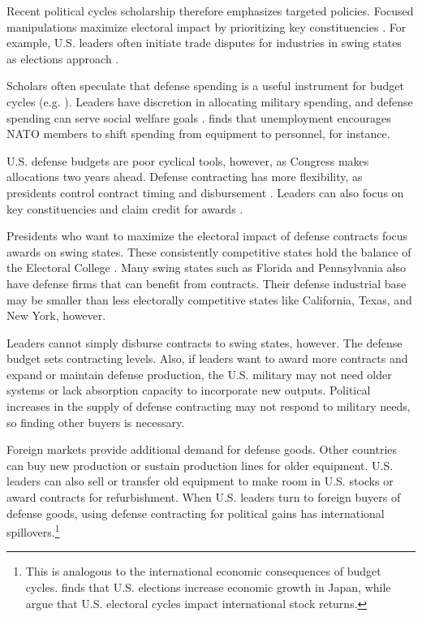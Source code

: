 \documentclass[12pt]{article}
\begin{document}
Recent political cycles scholarship therefore emphasizes targeted policies.
Focused manipulations maximize electoral impact by prioritizing key constituencies \citep[pg. 248]{Dubois2016}.
For example, U.S. leaders often initiate trade disputes for industries in swing states as elections approach \citep{Conconietal2017}.%


Scholars often speculate that defense spending is a useful instrument for budget cycles (e.g. \cite{Tufte1978, Mintz1988}).
Leaders have discretion in allocating military spending, and defense spending can serve social welfare goals \citep{WhittenWilliams2011}.
\citet{Becker2021} finds that unemployment encourages NATO members to shift spending from equipment to personnel, for instance.


U.S. defense budgets are poor cyclical tools, however, as Congress makes allocations two years ahead.
Defense contracting has more flexibility, as presidents control contract timing and disbursement \citep{Mayer1995, DerouenHeo2000}.
Leaders can also focus on key constituencies and claim credit for awards \citep{DerouenHeo2000}. 


Presidents who want to maximize the electoral impact of defense contracts focus awards on swing states.
These consistently competitive states hold the balance of the Electoral College \citep{KrinerReeves2015}. 
Many swing states such as Florida and Pennsylvania also have defense firms that can benefit from contracts.
Their defense industrial base may be smaller than less electorally competitive states like California, Texas, and New York, however. 


Leaders cannot simply disburse contracts to swing states, however. 
The defense budget sets contracting levels. 
Also, if leaders want to award more contracts and expand or maintain defense production, the U.S. military may not need older systems or lack absorption capacity to incorporate new outputs.
Political increases in the supply of defense contracting may not respond to military needs, so finding other buyers is necessary.


Foreign markets provide additional demand for defense goods.
Other countries can buy new production or sustain production lines for older equipment. 
U.S. leaders can also sell or transfer old equipment to make room in U.S. stocks or award contracts for refurbishment. 
When U.S. leaders turn to foreign buyers of defense goods, using defense contracting for political gains has international spillovers.\footnote{%
This is analogous to the international economic consequences of budget cycles. 
\citet{Ito1991} finds that U.S. elections increase economic growth in Japan, while \citet{FoersterSchmitz1997} argue that U.S. electoral cycles impact international stock returns.
}
\end{document}
